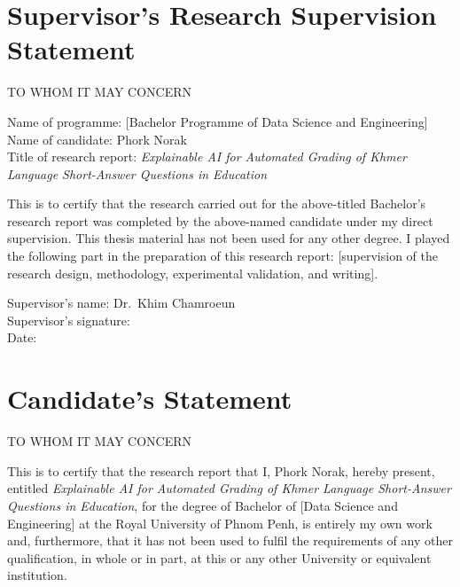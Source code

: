 \chapter*{Supervisor's Research Supervision Statement}

\noindent TO WHOM IT MAY CONCERN
\vspace{0.5cm}

\noindent Name of programme: [Bachelor Programme of Data Science and Engineering]\\
Name of candidate: Phork Norak\\
Title of research report: \emph{Explainable AI for Automated Grading of Khmer Language
Short-Answer Questions in Education}
\vspace{0.5cm}

\noindent This is to certify that the research carried out for the above-titled Bachelor's research
report was completed by the above-named candidate under my direct supervision. This thesis material
has not been used for any other degree. I played the following part in the preparation of this
research report: [supervision of the research design, methodology, experimental validation, and
writing].

\vspace{1.2cm}
\noindent Supervisor's name: Dr.\ Khim Chamroeun\\[0.8cm]
\noindent Supervisor's signature: \dotfill\\[0.6cm]
\noindent Date: \dotfill
\clearpage

\chapter*{Candidate's Statement}

\noindent TO WHOM IT MAY CONCERN
\vspace{0.5cm}

\noindent This is to certify that the research report that I, Phork Norak, hereby present,
entitled \emph{Explainable AI for Automated Grading of Khmer Language Short-Answer Questions in
Education}, for the degree of Bachelor of [Data Science and Engineering] at the Royal University of
Phnom Penh, is entirely my own work and, furthermore, that it has not been used to fulfil the
requirements of any other qualification, in whole or in part, at this or any other University or
equivalent institution.

